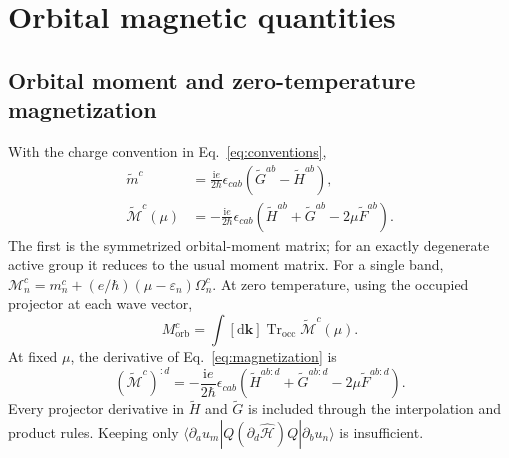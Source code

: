 \documentclass[prx,amsmath,amssymb,superscriptaddress,longbibliography]{revtex4-2}
\newcommand{\Tr}{\operatorname{Tr}}
\newcommand{\dd}{\mathrm{d}}
\newcommand{\ii}{\mathrm{i}}
\begin{document}
\section{Orbital magnetic quantities}
\label{sec:orbital}

\subsection{Orbital moment and zero-temperature magnetization}
With the charge convention in Eq.~\eqref{eq:conventions},
\begin{align}
 \widetilde m^c&=\frac{\ii e}{2\hbar}\epsilon_{cab}
                      (\widetilde G^{ab}-\widetilde H^{ab}),\label{eq:moment}\\
 \widetilde{\mathcal M}^c(\mu)
 &=-\frac{\ii e}{2\hbar}\epsilon_{cab}
    (\widetilde H^{ab}+\widetilde G^{ab}-2\mu\widetilde F^{ab}).
 \label{eq:magnetization}
\end{align}
The first is the symmetrized orbital-moment matrix; for an exactly degenerate
active group it reduces to the usual moment matrix.
For a single band,
$\mathcal M_n^c=m_n^c+(e/\hbar)(\mu-\varepsilon_n)\Omega_n^c$.
At zero temperature, using the occupied projector at each wave vector,
\begin{equation}
 M_{\mathrm{orb}}^c=\int[\dd\bm k]\Tr_{\mathrm{occ}}
                    \widetilde{\mathcal M}^c(\mu).
 \label{eq:magnetization-integral}
\end{equation}
At fixed $\mu$, the derivative of Eq.~\eqref{eq:magnetization} is
\begin{equation}
 (\widetilde{\mathcal M}^c)^{:d}
 =-\frac{\ii e}{2\hbar}\epsilon_{cab}
 (\widetilde H^{ab:d}+\widetilde G^{ab:d}-2\mu\widetilde F^{ab:d}).
 \label{eq:magnetization-derivative}
\end{equation}
Every projector derivative in $\widetilde H$ and $\widetilde G$ is included
through the interpolation and product rules. Keeping only
$\langle\partial_a u_m|Q(\partial_d\hat{\mathcal H})Q|\partial_b u_n\rangle$
is insufficient.
\end{document}
